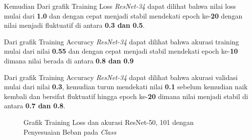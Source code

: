 Kemudian Dari grafik Training Loss \emph{ResNet-34} dapat dilihat bahwa nilai loss mulai dari \textbf{1.0} dan dengan cepat menjadi stabil mendekati epoch ke-\textbf{20} dengan nilai menjadi fluktuatif di antara \textbf{0.3 dan 0.5}.

Dari grafik Training Accuracy \emph{ResNet-34} dapat dilihat bahwa akurasi training mulai dari nilai \textbf{0.55} dan dengan cepat menjadi stabil mendekati epoch ke-\textbf{10} dimana nilai berada di antara \textbf{0.8 dan 0.9} 

Dari grafik Training Accuracy \emph{ResNet-34} dapat dilihat bahwa akurasi validasi mulai dari nilai \textbf{0.3}, kemudian turun mendekati nilai \textbf{0.1} sebelum kemudian naik kembali dan bersifat fluktuatif hingga epoch ke-\textbf{20} dimana nilai menjadi stabil di antara \textbf{0.7 dan 0.8}.

\begin{figure}[H]
	\centering
	\qquad
	\caption{Grafik Training Loss dan akurasi ResNet-50, 101 dengan Penyesuaian Beban pada \emph{Class}}
	\label{fig:graphTrainingWeightedPt2}
\end{figure}

